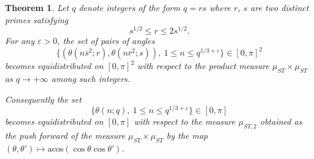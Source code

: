 \documentclass[12pt,a4paper,reqno]{amsart}
\numberwithin{equation}{section}
\theoremstyle{plain}
\newtheorem{theorem}{Theorem}[section]
\theoremstyle{definition}
\newcommand\eps{\varepsilon}
\newcommand\ov{\overline}
\newcommand{\ra}{\rightarrow}
\begin{document}
\begin{theorem} 
  Let $q$ denote integers of the form $q=rs$ where $r$, $s$ are two
  distinct primes satisfying
$$ 
s^{1/2}\leq r\leq 2s^{1/2}.
$$ 
For any $\eps>0$, the set of pairs of angles
$$
\{(\theta(n\ov s^2;r),\theta(n\ov r^2;s)),\ 1\leq n\leq
q^{1/3+\eps}\}\in [0,\pi]^2
$$
becomes equidistributed on $[0,\pi]^2$ with respect to the product
measure $\mu_{ST}\times\mu_{ST}$ as $q\ra +\infty$ among such
integers.  
\par 
Consequently the set
$$
\{\theta(n;q),\ 1\leq n\leq q^{1/3+\eps}\}\in [0,\pi]
$$ 
becomes equidistributed on $[0,\pi]$ with respect to the measure
$\mu_{ST,2}$ obtained as the push forward of the measure
$\mu_{ST}\times\mu_{ST}$ by the map $(\theta,\theta')\mapsto
\mathrm{acos}(\cos\theta\cos\theta')$.
\end{theorem}
\end{document}
